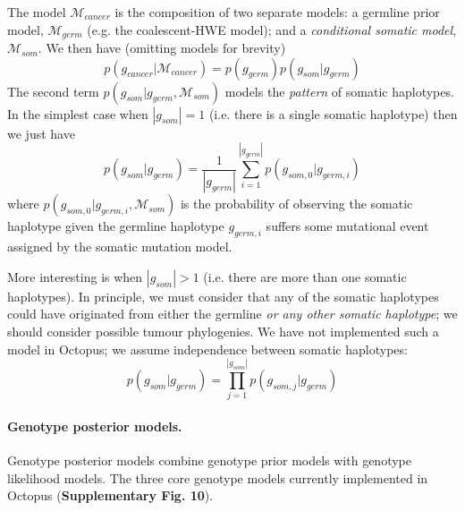 \documentclass[notitlepage, twocolumn, 10pt]{article}
\begin{document}
The model $\mathcal{M}_{cancer}$ is the composition of two separate models: a germline prior model, $\mathcal{M}_{germ}$ (e.g. the coalescent-HWE model); and a \emph{conditional somatic model}, $\mathcal{M}_{som}$. We then have (omitting models for brevity)
\begin{equation*}
 p(g_{cancer} | \mathcal{M}_{cancer}) = p(g_{germ}) p(g_{som} | g_{germ})
\end{equation*}
The second term $p(g_{som} | g_{germ}, \mathcal{M}_{som})$ models the \emph{pattern} of somatic haplotypes. In the simplest case when $|g_{som}| = 1$ (i.e. there is a single somatic haplotype) then we just have
\begin{equation*}
	p(g_{som} | g_{germ}) = \frac{1}{|g_{germ}|} \sum_{i = 1}^{|g_{germ}|} p(g_{som,0} | g_{germ, i})
\end{equation*}
where $p(g_{som,0} | g_{germ, i}, \mathcal{M}_{som})$ is the probability of observing the somatic haplotype given the germline haplotype $g_{germ, i}$ suffers some mutational event assigned by the somatic mutation model.

More interesting is when $|g_{som}| > 1$ (i.e. there are more than one somatic haplotypes). In principle, we must consider that any of the somatic haplotypes could have originated from either the germline \emph{or any other somatic haplotype}; we should consider possible tumour phylogenies. We have not implemented such a model in Octopus; we assume independence between somatic haplotypes:
\begin{equation*}
p(g_{som} | g_{germ}) = \prod_{j = 1}^{|g_{som}|} p(g_{som,j} | g_{germ})
\end{equation*}

\paragraph*{Genotype posterior models.} Genotype posterior models combine genotype prior models with genotype likelihood models. The three core genotype models currently implemented in Octopus (\textbf{Supplementary Fig. 10}).
\end{document}

